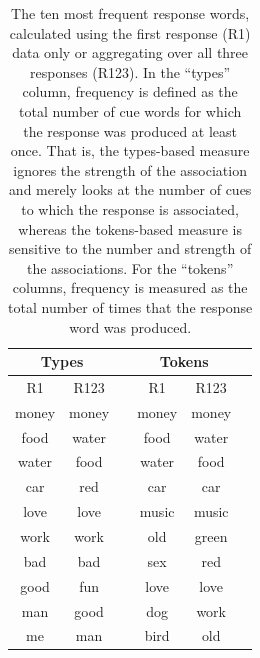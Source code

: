 \documentclass[a4paper,doc,natbib,floatsintext]{apa6}
\begin{document}
\begin{table}[t]
\centering
\caption{The ten most frequent response words, calculated using the first response (R1) data only or aggregating over all three responses (R123). In the ``types'' column, frequency is defined as the total number of cue words for which the response was produced at least once. That is, the types-based measure ignores the strength of the association and merely looks at the number of cues to which the response is associated, whereas the tokens-based measure is sensitive to the number and strength of the associations. For the ``tokens'' columns, frequency is measured as the total number of times that the response word was produced.}
\label{Table:ResponseExamples}
\begin{tabular}{@{}cccccc@{}}
\toprule
\multicolumn{2}{c}{\textbf{Types}}      &        & \multicolumn{2}{c}{\textbf{Tokens}}               &                      \\
\midrule
\multicolumn{1}{c}{R1} & \multicolumn{1}{c}{R123} & \multicolumn{1}{c}{} & \multicolumn{1}{c}{R1} & \multicolumn{1}{c}{R123} \\
\cmidrule(r){1-2} \cmidrule(lr){4-5}
money      & money                  &   & money              & money       &           \\
food       & water                  &   & food               & water       &           \\
water      & food                   &   & water              & food        &           \\
car        & red                    &   & car                & car         &           \\
love       & love                   &   & music              & music       &           \\
work       & work                   &   & old                & green       &           \\
bad        & bad                    &   & sex                & red         &           \\
good       & fun                    &   & love               & love        &           \\
man        & good                   &   & dog                & work        &           \\
me         & man                    &   & bird               & old         &           \\
\bottomrule
\end{tabular}
\end{table}
\end{document}

